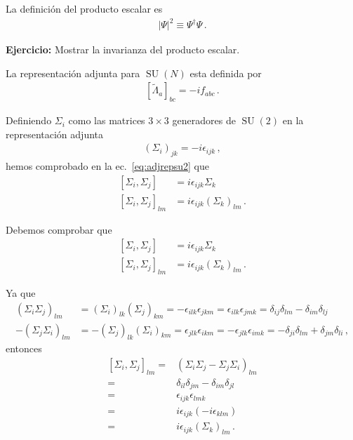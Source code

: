 La definición del producto escalar es
\begin{align}
  | \Psi |^2 \equiv \Psi^{\dagger}\Psi\,. 
\end{align}

\textbf{Ejercicio:} Mostrar la invarianza del producto escalar.



La representación adjunta para $\operatorname{SU}(N)$ esta definida por
\begin{align}
  \left[ \widetilde{\Lambda}_a \right]_{bc}=-i f_{abc}\,.
\end{align}

Definiendo $\Sigma_i$ como las matrices $3\times3$ generadores de $\operatorname{SU}(2)$ en la representaci\'on adjunta
\begin{align}
  (\Sigma_i)_{jk}=-i\epsilon_{ijk}\,,
\end{align}
hemos comprobado en la ec.~\eqref{eq:adjrepsu2} que
\begin{align}
  \left[{\Sigma_i},{\Sigma_j}\right]&=i\epsilon_{ijk}{\Sigma_k}\nonumber\\
  \left[{\Sigma_i},{\Sigma_j}\right]_{lm}&=i\epsilon_{ijk}(\Sigma_k)_{lm}\,.
\end{align}

Debemos comprobar que
\begin{align}
  \left[{\Sigma_i},{\Sigma_j}\right]&=i\epsilon_{ijk}{\Sigma_k}\nonumber\\
  \left[{\Sigma_i},{\Sigma_j}\right]_{lm}&=i\epsilon_{ijk}(\Sigma_k)_{lm}\,.
\end{align}

Ya que
\begin{align}
  \label{eq:167}
  (\Sigma_i\Sigma_j)_{lm}&=(\Sigma_i)_{lk}(\Sigma_j)_{km}=-\epsilon_{ilk}\epsilon_{jkm}=\epsilon_{ilk}\epsilon_{jmk}=\delta_{ij}\delta_{lm}-\delta_{im}\delta_{lj}\nonumber\\
  -(\Sigma_j\Sigma_i)_{lm}&=-(\Sigma_j)_{lk}(\Sigma_i)_{km}=\epsilon_{jlk}\epsilon_{ikm}=-\epsilon_{jlk}\epsilon_{imk}=-\delta_{ji}\delta_{lm}+\delta_{jm}\delta_{li}\,,
\end{align}
entonces
\begin{align}
\label{eq:adjrepsu2}
[\Sigma_i,\Sigma_j]_{lm}=& (\Sigma_i\Sigma_j-\Sigma_j\Sigma_i)_{lm}\nonumber\\
=&\delta_{il}\delta_{jm}-\delta_{im}\delta_{jl}\nonumber\\
=&\epsilon_{ijk}\epsilon_{lmk}\nonumber\\
=&i\epsilon_{ijk}(-i\epsilon_{klm})\nonumber\\
=&i\epsilon_{ijk}(\Sigma_k)_{lm}\,.
\end{align}







